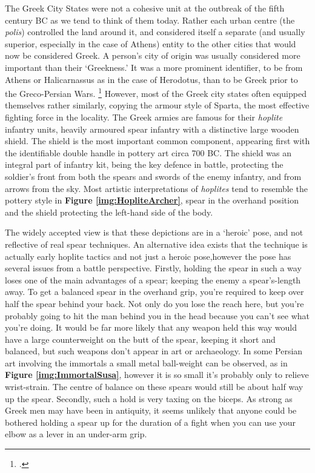 \documentclass[twoside, a4paper, 12pt]{article}
\begin{document}
The Greek City States were not a cohesive unit at the outbreak of the fifth century
BC as we tend to think of them today. Rather each urban centre (the
\emph{polis}) controlled
the land around it, and considered itself a separate (and usually superior, especially
in the case of Athens)
entity to the other cities that would now be considered Greek. A person's city of
origin was usually considered more important than their `Greekness.' It was
a more prominent identifier, to be from Athens or Halicarnassus
as in the case of Herodotus, than to be Greek prior to the
Greco-Persian Wars.
\footcite{kim_grecopersia_2017}
However, most of the Greek city states often equipped
themselves rather similarly, copying the armour style of Sparta, the most
effective fighting force in the locality.
The Greek armies are famous for their \emph{hoplite} infantry units, heavily
armoured spear infantry with a distinctive large wooden shield. The shield is
the most important common component, appearing first with the
identifiable double handle in pottery art
circa 700 BC.\footnotemark
The shield was an integral part of infantry kit, being the key defence in battle,
protecting the soldier's front from both the spears and swords of the enemy
infantry, and from arrows from the sky.
Most artistic interpretations of \emph{hoplites} tend to resemble the pottery
style in \textbf{Figure \ref{img:HopliteArcher}}, spear in the overhand
position and the shield protecting the left-hand side of the body.

\par\vspace{1em}

The widely accepted view is that these depictions are in a `heroic' pose, and not
reflective of real spear techniques. An alternative idea exists
that the technique is actually early hoplite tactics and not just a heroic
pose,\footnotemark[\value{footnote}] however the pose has several issues from
a battle perspective.
Firstly, holding the spear in such a way loses one of the main advantages of a
spear; keeping the enemy a spear's-length away.
To get a balanced spear in the overhand grip, you're required
to keep over half the spear behind your back. Not only do you lose the reach here,
but you're probably going to hit the man behind you in the head because you
can't see what you're doing. It would be far more likely that any weapon held
this way would have a large counterweight on the butt of the spear, keeping it short
and balanced, but such weapons don't appear in art or archaeology. In some Persian
art involving the immortals a small metal ball-weight can be observed, as in
\textbf{Figure \ref{img:ImmortalSusa}},
however it is so small it's probably only to relieve wrist-strain. The
centre of balance on these spears would still be about half way
up the spear. Secondly,
such a hold is very taxing on the biceps. As strong as Greek men may have been
in antiquity, it seems unlikely that anyone could be bothered holding a spear
up for the duration of a fight when you can use your elbow as a lever in
an under-arm grip.
\end{document}
